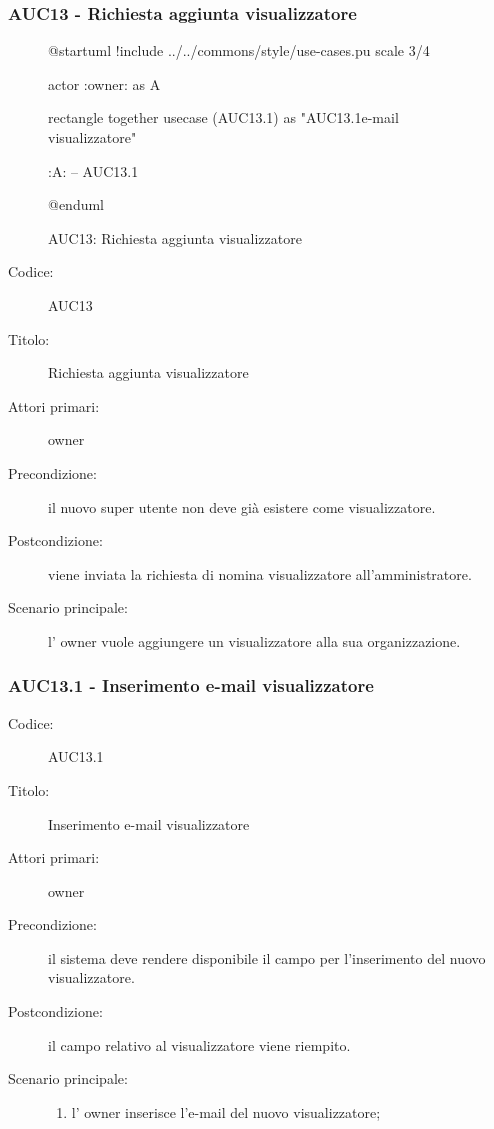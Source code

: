 \documentclass[casi-duso]{subfiles}
\begin{document}
\subsubsection{AUC13 - Richiesta aggiunta visualizzatore}%
\label{subsub:AUC13}

\begin{figure}[h!]
  \centering
  \begin{plantuml}
  @startuml
  !include ../../commons/style/use-cases.pu
  scale 3/4

  actor :owner: as A

  rectangle {
    together {
      usecase (AUC13.1) as "AUC13.1\nInserimento e-mail visualizzatore"
    }
  }

  :A: -- AUC13.1

  @enduml
  \end{plantuml}
  \caption{AUC13: Richiesta aggiunta visualizzatore}
  \label{fig:auc13}
\end{figure}

\begin{description}
  \item[Codice:] AUC13
  \item[Titolo:] Richiesta aggiunta visualizzatore
  \item[Attori primari:] owner
  \item[Precondizione:] il nuovo super utente non deve già esistere come visualizzatore.
  \item[Postcondizione:] viene inviata la richiesta di nomina visualizzatore all'amministratore.
  \item[Scenario principale:] l' owner vuole aggiungere un visualizzatore alla sua organizzazione.
\end{description}

\subsubsection{AUC13.1 - Inserimento e-mail visualizzatore}%
\label{subsub:AUC13.1}
\begin{description}
  \item[Codice:] AUC13.1
  \item[Titolo:] Inserimento e-mail visualizzatore
  \item[Attori primari:] owner
  \item[Precondizione:] il sistema deve rendere disponibile il campo per l'inserimento del nuovo visualizzatore.
  \item[Postcondizione:] il campo relativo al visualizzatore viene riempito.
  \item[Scenario principale:]
  \begin{enumerate}
    \item l' owner inserisce l'e-mail del nuovo visualizzatore;
  \end{enumerate}
\end{description}
\end{document}
